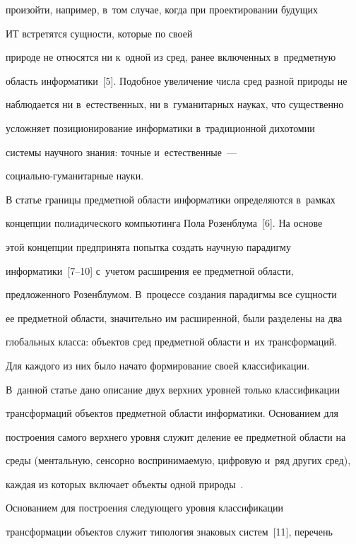 произойти, например, в~том случае, когда при проектировании будущих 

ИТ встретятся сущности, которые по своей 

природе не относятся ни к~одной из сред, ранее включенных в~предметную 

об\-ласть информатики~[5]. Подобное увеличение числа сред разной природы не 

наблюдается ни в~естественных, ни в~гуманитарных науках, что существенно 

услож\-ня\-ет позиционирование информатики в~традиционной дихотомии 

сис\-те\-мы научного знания: точные и~естественные~---  

со\-ци\-аль\-но-гу\-ма\-ни\-тар\-ные науки.

{



}

  

  В статье границы предметной области информатики определяются в~рамках 

концепции полиадического компьютинга Пола Розенблума~[6]. На основе 

этой концепции предпринята попытка создать научную парадигму 

информатики~[7--10] с~учетом расширения ее предметной об\-ласти, 

предложенного Розенблумом. В~процессе создания парадигмы все сущности 

ее предметной области, значительно им расширенной, были разделены на два 

глобальных класса: объектов сред предметной области и~их трансформаций. 

Для каждого из них было начато формирование своей классификации. 

В~данной статье дано описание двух верхних уровней только классификации 

трансформаций объектов предметной области информатики. Основанием для 

построения самого верхнего уровня служит деление ее предметной области на 

среды (ментальную, сенсорно воспринимаемую, цифровую и~ряд других сред), 

каждая из которых включает объекты одной природы~\cite{7-zac, 10-zac}. 

Основанием для построения сле\-ду\-юще\-го уровня классификации 

трансформации объектов служит типология знаковых систем~[11], перечень 

